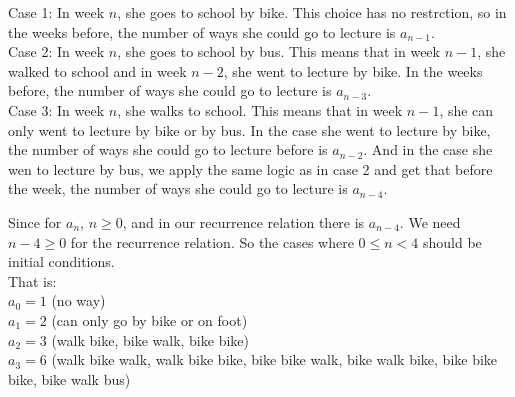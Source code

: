 \documentclass[12pt]{exam}
\begin{document}
\begin{solution}
\begin{qparts}
            Case 1: In week $n$, she goes to school by bike. This choice has no restrction, so in the weeks before,
            the number of ways she could go to lecture is $a_{n-1}$.
            \\Case 2: In week $n$, she goes to school by bus. This means that in week $n-1$, she walked to school and in
            week $n-2$, she went to lecture by bike. In the weeks before, the number of ways she could go to lecture is $a_{n-3}$.\\
            Case 3: In week $n$, she walks to school. This means that in week $n-1$, she can only went to lecture by bike or by bus. In the
            case she went to lecture by bike, the number of ways she could go to lecture before is $a_{n-2}$. And in the case she wen to 
            lecture by bus, we apply the same logic as in case 2 and get that before the week, the number of ways she could 
            go to lecture is $a_{n-4}$.
        \item
            Since for $a_n$, $n \geq 0$, and in our recurrence relation there is $a_{n-4}$. We need $n-4 \geq 0$ for the 
            recurrence relation. So the cases where $0 \leq n < 4$ should be initial conditions.\\
            That is:
            \\ $a_0 = 1$ (no way)
            \\ $a_1 = 2$ (can only go by bike or on foot)
            \\ $a_2 = 3$ (walk bike, bike walk, bike bike)
            \\ $a_3 = 6$ (walk bike walk, walk bike bike, bike bike walk, bike walk bike, bike bike bike, bike walk bus)

    \end{qparts}
\end{solution}
\end{document}

